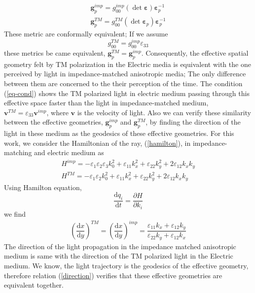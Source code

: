 \documentclass[9pt,twocolumn,twoside]{osajnl}
\begin{document}
\begin{eqnarray}
\mathbf{g}^{imp}_{p}=g^{imp}_{00}(\det{\boldsymbol{\varepsilon}})\boldsymbol{\varepsilon}^{-1}_{p}
\label{gimp}\\
\mathbf{g}^{TM}_{p}=g^{TM}_{00}(\det{\boldsymbol{\varepsilon}}_{p})\boldsymbol{\varepsilon}_{p}^{-1}
\label{gtm}
\end{eqnarray}
These metric are conformally equivalent; If we assume
\begin{equation}\label{eq-cond}
g^{TM}_{00}=g^{imp}_{00}\varepsilon_{33}
\end{equation}
these metrics be came equivalent, $\mathbf{g}^{TM}_{p}=\mathbf{g}^{imp}_{p}$. Consequently, the effective spatial geometry felt by TM polarization in the Electric media is equivalent with the one perceived by light in impedance-matched anisotropic media; The only difference between them are concerned to the their perception of the time. The condition (\ref{eq-cond}) shows the TM polarized light in electric medium passing through this effective space faster than the light in impedance-matched medium, $\mathbf{v}^{TM}=\varepsilon_{33}\mathbf{v}^{imp}$, where $\mathbf{v}$ is the velocity of light.
Also we can verify these similarity between the effective geometries, $\mathbf{g}^{imp}_{p}$ and $\mathbf{g}^{TM}_{p}$, by finding the direction of the light in these medium as the geodesics of these effective geometries. For this work, we consider the Hamiltonian of the ray, (\ref{hamilton}), in  impedance-matching and electric medium as
 \begin{eqnarray}
H^{imp}=-\varepsilon_{1}\varepsilon_{2}\varepsilon_{3} k_{0}^{2}+\varepsilon_{11}k_{x}^{2}+\varepsilon_{22}k_{y}^{2}+2\varepsilon_{12}k_{x}k_{y}\\
H^{TM}=-\varepsilon_{1}\varepsilon_{2} k_{0}^{2}+\varepsilon_{11}k_{x}^{2}+\varepsilon_{22}k_{y}^{2}+2\varepsilon_{12}k_{x}k_{y}
\end{eqnarray}
Using Hamilton equation, 
\begin{equation}
\dfrac{\mathrm{d}q_{i}}{\mathrm{d}t}=\dfrac{\partial{H}}{\partial{k_{i}}}
\end{equation}
we find
\begin{eqnarray}\label{direction}
\left(\dfrac{\mathrm{d}x}{\mathrm{d}y}\right)^{TM}=\left(\dfrac{\mathrm{d}x}{\mathrm{d}y}\right)^{imp}=\dfrac{\varepsilon_{11}k_{x}+\varepsilon_{12}k_{y}}{\varepsilon_{22}k_{y}+\varepsilon_{12}k_{x}}
\end{eqnarray}
The direction of the light propagation in the impedance matched anisotropic medium is same with the direction of the TM polarized light in the Electric medium. We know, the light trajectory is the geodesics of the effective geometry, therefore relation (\ref{direction}) verifies that these effective geometries are equivalent together.
\end{document}
